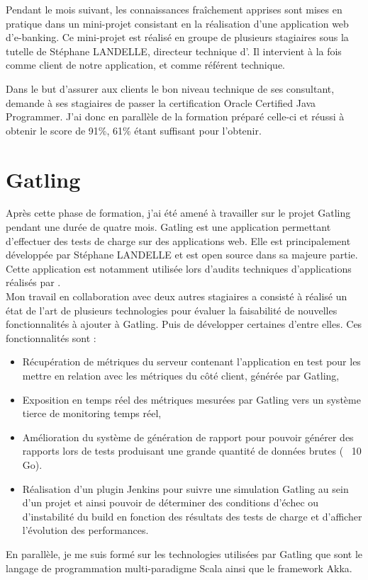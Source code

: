 Pendant le mois suivant, les connaissances fraîchement apprises sont mises en pratique dans un mini-projet consistant en la réalisation d'une application web d'e-banking. Ce mini-projet est réalisé en groupe de plusieurs stagiaires sous la tutelle de Stéphane LANDELLE, directeur technique d'\ebi{}. Il intervient à la fois comme client de notre application, et comme référent technique.

Dans le but d'assurer aux clients le bon niveau technique de ses consultant, \ebi{} demande à ses stagiaires de passer la certification Oracle Certified Java Programmer. J'ai donc en parallèle de la formation préparé celle-ci et réussi à obtenir le score de 91\%, 61\% étant suffisant pour l'obtenir. 

\section{Gatling}

Après cette phase de formation, j'ai été amené à travailler sur le projet Gatling pendant une durée de quatre mois. Gatling est une application permettant d'effectuer des tests de charge sur des applications web. Elle est principalement développée par Stéphane LANDELLE et est open source dans sa majeure partie. Cette application est notamment utilisée lors d'audits techniques d'applications réalisés par \ebi{}.\\

Mon travail en collaboration avec deux autres stagiaires a consisté à réalisé un état de l'art de plusieurs technologies pour évaluer la faisabilité de nouvelles fonctionnalités à ajouter à Gatling. Puis de développer certaines d'entre elles. Ces fonctionnalités sont :

\begin{itemize}
	\item Récupération de métriques du serveur contenant l'application en test pour les mettre en relation avec les métriques du côté client, générée par Gatling,
	\item Exposition en temps réel des métriques mesurées par Gatling vers un système tierce de monitoring temps réel,
	\item Amélioration du système de génération de rapport pour pouvoir générer des rapports lors de tests produisant une grande quantité de données brutes (~ 10 Go).
	\item Réalisation d'un plugin Jenkins pour suivre une simulation Gatling au sein d'un projet et ainsi pouvoir de déterminer des conditions d'échec ou d'instabilité du build en fonction des résultats des tests de charge et d'afficher l'évolution des performances.\\
\end{itemize}

En parallèle, je me suis formé sur les technologies utilisées par Gatling que sont le langage de programmation multi-paradigme Scala ainsi que le framework Akka.